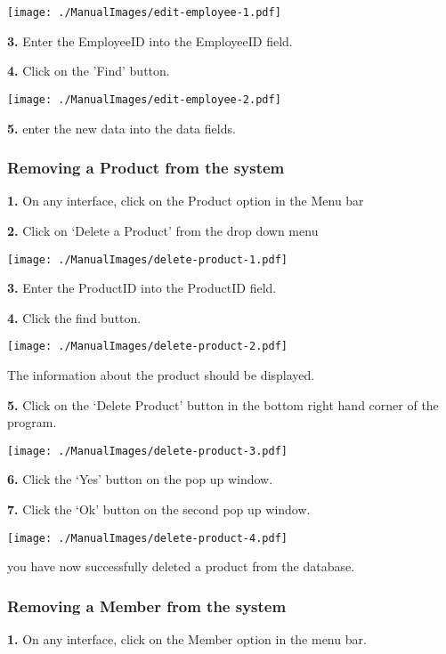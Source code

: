 \texttt{[image: ./ManualImages/edit-employee-1.pdf]}

\textbf{3.} Enter the EmployeeID into the EmployeeID field.

\textbf{4.} Click on the 'Find' button.

\texttt{[image: ./ManualImages/edit-employee-2.pdf]}

\textbf{5.} enter the new data into the data fields.

\pagebreak
\subsubsection{Removing a Product from the system}
\label{fig:Removing a Product from the system}

\textbf{1.} On any interface, click on the Product option in the Menu bar

\textbf{2.} Click on `Delete a Product' from the drop down menu

\texttt{[image: ./ManualImages/delete-product-1.pdf]}

\textbf{3.} Enter the ProductID into the ProductID field.

\textbf{4.} Click the find button.

\texttt{[image: ./ManualImages/delete-product-2.pdf]}

The information about the product should be displayed.

\textbf{5.} Click on the `Delete Product' button in the bottom right hand corner of the program.

\texttt{[image: ./ManualImages/delete-product-3.pdf]}

\textbf{6.} Click the `Yes' button on the pop up window.

\textbf{7.} Click the `Ok' button on the second pop up window.

\texttt{[image: ./ManualImages/delete-product-4.pdf]}

you have now successfully deleted a product from the database.

\pagebreak
\subsubsection{Removing a Member from the system}
\label{fig:Removing a Member from the system}

\textbf{1.} On any interface, click on the Member option in the menu bar.


